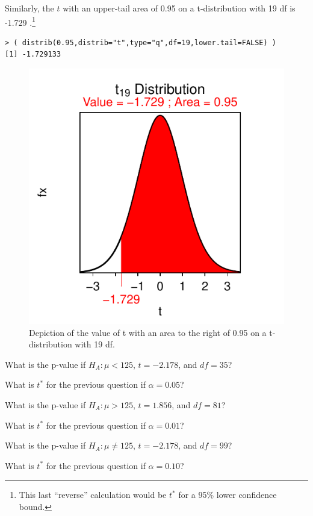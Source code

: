 \documentclass[10pt,openany]{book}\usepackage[]{graphicx}\usepackage[]{color}
\makeatletter
\newenvironment{kframe}{%
 \def\at@end@of@kframe{}%
 \ifinner\ifhmode%
  \def\at@end@of@kframe{\end{minipage}}%
  \begin{minipage}{\columnwidth}%
 \fi\fi%
 \def\FrameCommand##1{\hskip\@totalleftmargin \hskip-\fboxsep
 \colorbox{shadecolor}{##1}\hskip-\fboxsep
     \hskip-\linewidth \hskip-\@totalleftmargin \hskip\columnwidth}%
 \MakeFramed {\advance\hsize-\width
   \@totalleftmargin\z@ \linewidth\hsize
   \@setminipage}}%
 {\par\unskip\endMakeFramed%
 \at@end@of@kframe}
\newenvironment{knitrout}{}{} %
\makeatother
\begin{document}
Similarly, the $t$ with an upper-tail area of 0.95 on a t-distribution with 19 df is -1.729 .\footnote{This last ``reverse'' calculation would be $t^{*}$ for a 95\% lower confidence bound.}
\begin{knitrout}
\color{fgcolor}\begin{kframe}
\begin{verbatim}
> ( distrib(0.95,distrib="t",type="q",df=19,lower.tail=FALSE) )
[1] -1.729133
\end{verbatim}
\end{kframe}\begin{figure}[hbtp]

{\centering \includegraphics[width=.4\linewidth]{Figs/tstar1-1} 

}

\caption[Depiction of the value of t with an area to the right of 0.95 on a t-distribution with 19 df]{Depiction of the value of t with an area to the right of 0.95 on a t-distribution with 19 df.}\label{fig:tstar1}
\end{figure}


\end{knitrout}

\begin{exsection}
  \item \label{revex:tTestpv1} \rhw{} What is the p-value if $H_{A}:\mu<125$, $t=-2.178$, and $df=35$? 
  \item \label{revex:tTestci1} \rhw{} What is $t^{*}$ for the previous question if $\alpha=0.05$? 
  \item \label{revex:tTestpv2} \rhw{} What is the p-value if $H_{A}:\mu>125$, $t=1.856$, and $df=81$? 
  \item \label{revex:tTestci2} \rhw{} What is $t^{*}$ for the previous question if $\alpha=0.01$? 
  \item \label{revex:tTestpv3} \rhw{} What is the p-value if $H_{A}:\mu\neq125$, $t=-2.178$, and $df=99$? 
  \item \label{revex:tTestci3} \rhw{} What is $t^{*}$ for the previous question if $\alpha=0.10$? 
\end{exsection}
\end{document}

